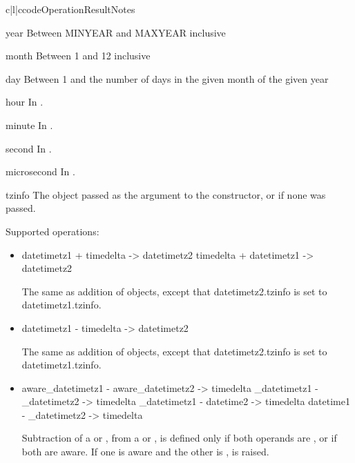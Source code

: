 \begin{tableiii}{c|l|c}{code}{Operation}{Result}{Notes}
\begin{memberdesc}{year}
Between MINYEAR and MAXYEAR inclusive
\end{memberdesc}
\begin{memberdesc}{month}
Between 1 and 12 inclusive
\end{memberdesc}
\begin{memberdesc}{day}
Between 1 and the number of days in the given month
                    of the given year
\end{memberdesc}
\begin{memberdesc}{hour}
In .
\end{memberdesc}
\begin{memberdesc}{minute}
In .
\end{memberdesc}
\begin{memberdesc}{second}
In .
\end{memberdesc}
\begin{memberdesc}{microsecond}
In .
\end{memberdesc}
\begin{memberdesc}{tzinfo}
The object passed as the  argument to
                    the  constructor, or 
                    if none was passed.
\end{memberdesc}

Supported operations:

\begin{itemize}
  \item
    datetimetz1 + timedelta -> datetimetz2
    timedelta + datetimetz1 -> datetimetz2

    The same as addition of  objects, except that
    datetimetz2.tzinfo is set to datetimetz1.tzinfo.

  \item
    datetimetz1 - timedelta -> datetimetz2

    The same as addition of  objects, except that
    datetimetz2.tzinfo is set to datetimetz1.tzinfo.

  \item
    aware_datetimetz1 - aware_datetimetz2 -> timedelta
    {\naive}_datetimetz1 - {\naive}_datetimetz2 -> timedelta
    {\naive}_datetimetz1 - datetime2 -> timedelta
    datetime1 - {\naive}_datetimetz2 -> timedelta

    Subtraction of a  or , from a
     or , is defined only if both
    operands are \naive, or if both are aware.  If one is aware and the
    other is \naive,  is raised.


\end{itemize}
\end{tableiii}
